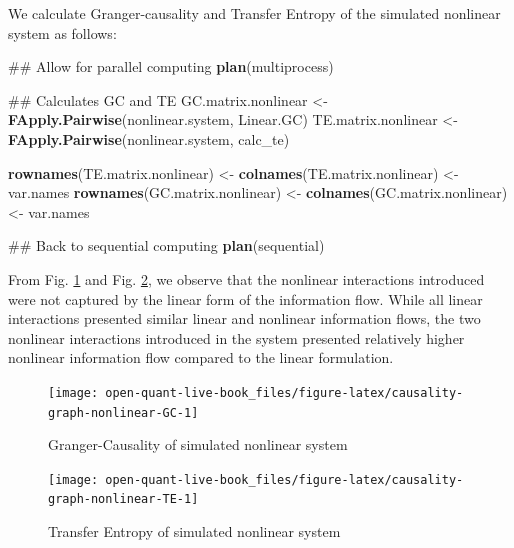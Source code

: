 \documentclass[]{book}
\newenvironment{Shaded}{\begin{snugshade}}{\end{snugshade}}
\newcommand{\KeywordTok}[1]{\textcolor[rgb]{0.13,0.29,0.53}{\textbf{#1}}}
\newcommand{\StringTok}[1]{\textcolor[rgb]{0.31,0.60,0.02}{#1}}
\newcommand{\NormalTok}[1]{#1}
\theoremstyle{definition}
\theoremstyle{definition}
\theoremstyle{definition}
\theoremstyle{remark}
\begin{document}
We calculate Granger-causality and Transfer Entropy of the simulated
nonlinear system as follows:

\begin{Shaded}
\begin{Highlighting}[]
\NormalTok{## Allow for parallel computing}
\KeywordTok{plan}\NormalTok{(multiprocess)}


\NormalTok{## Calculates GC and TE}
\NormalTok{GC.matrix.nonlinear <-}\StringTok{ }\KeywordTok{FApply.Pairwise}\NormalTok{(nonlinear.system, }
\NormalTok{  Linear.GC)}
\NormalTok{TE.matrix.nonlinear <-}\StringTok{ }\KeywordTok{FApply.Pairwise}\NormalTok{(nonlinear.system, }
\NormalTok{  calc_te)}

\KeywordTok{rownames}\NormalTok{(TE.matrix.nonlinear) <-}\StringTok{ }\KeywordTok{colnames}\NormalTok{(TE.matrix.nonlinear) <-}\StringTok{ }\NormalTok{var.names}
\KeywordTok{rownames}\NormalTok{(GC.matrix.nonlinear) <-}\StringTok{ }\KeywordTok{colnames}\NormalTok{(GC.matrix.nonlinear) <-}\StringTok{ }\NormalTok{var.names}

\NormalTok{## Back to sequential computing}
\KeywordTok{plan}\NormalTok{(sequential)}
\end{Highlighting}
\end{Shaded}

From Fig. \ref{fig:causality-graph-nonlinear-GC} and Fig.
\ref{fig:causality-graph-nonlinear-TE}, we observe that the nonlinear
interactions introduced were not captured by the linear form of the
information flow. While all linear interactions presented similar linear
and nonlinear information flows, the two nonlinear interactions
introduced in the system presented relatively higher nonlinear
information flow compared to the linear formulation.

\begin{figure}[H]

{\centering \texttt{[image: open-quant-live-book\_files/figure-latex/causality-graph-nonlinear-GC-1]} 

}

\caption{Granger-Causality of simulated nonlinear system}\label{fig:causality-graph-nonlinear-GC}
\end{figure}

\begin{figure}[H]

{\centering \texttt{[image: open-quant-live-book\_files/figure-latex/causality-graph-nonlinear-TE-1]} 

}

\caption{Transfer Entropy of simulated nonlinear system}\label{fig:causality-graph-nonlinear-TE}
\end{figure}
\end{document}
